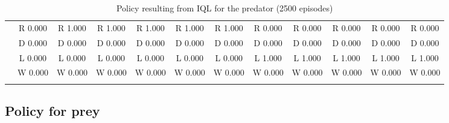 \begin{table}[htbp]
\begin{tiny}
\begin{tabular}{c|c|c|c|c|c|c|c|c|c|c|c|}
&R 0.000&R 1.000&R 1.000&R 1.000&R 1.000&R 1.000&R 0.000&R 0.000&R 0.000&R 0.000&R 0.000\\
&D 0.000&D 0.000&D 0.000&D 0.000&D 0.000&D 0.000&D 0.000&D 0.000&D 0.000&D 0.000&D 0.000\\
&L 0.000&L 0.000&L 0.000&L 0.000&L 0.000&L 0.000&L 1.000&L 1.000&L 1.000&L 1.000&L 1.000\\
&W 0.000&W 0.000&W 0.000&W 0.000&W 0.000&W 0.000&W 0.000&W 0.000&W 0.000&W 0.000&W 0.000\\
\hline \\
\end{tabular}
\end{tiny}
\caption{Policy resulting from IQL for the predator (2500 episodes)}
\end{table}

\clearpage
\subsection{Policy for prey}

